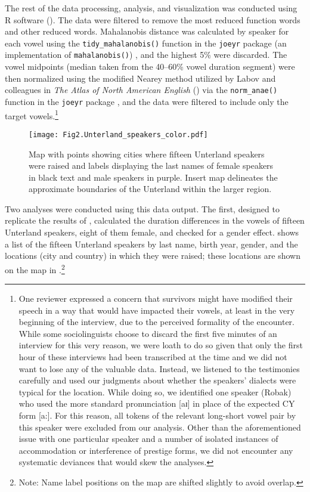 \documentclass[output=paper,colorlinks,citecolor=brown]{langscibook}
\begin{document}
The rest of the data processing, analysis, and visualization was conducted using R software (\citealt{Team2021}). The data were filtered to remove the most reduced function words and other reduced words. Mahalanobis distance was calculated by speaker for each vowel using the \texttt{tidy\_mahalanobis()} function in the \texttt{joeyr} package (an implementation of \texttt{mahalanobis()}) \citep{Stanley2020}, and the highest 5\% were discarded. The vowel midpoints (median taken from the 40--60\% vowel duration segment) were then normalized using the modified Nearey method utilized by Labov and colleagues in \textit{The Atlas of North American English} (\citealt{LabovBoberg2006}) via the \texttt{norm\_anae()} function in the \texttt{joeyr} package \citep{Stanley2020}, and the data were filtered to include only the target vowels.\footnote{One reviewer expressed a concern that survivors might have modified their speech in a way that would have impacted their vowels, at least in the very beginning of the interview, due to the perceived formality of the encounter. While some sociolinguists choose to discard the first five minutes of an interview for this very reason, we were loath to do so given that only the first hour of these interviews had been transcribed at the time and we did not want to lose any of the valuable data. Instead, we listened to the testimonies carefully and used our judgments about whether the speakers' dialects were typical for the location. While doing so, we identified one speaker (Robak) who used the more standard pronunciation [aɪ] in place of the expected CY form [a:]. For this reason, all tokens of the relevant long-short vowel pair by this speaker were excluded from our analysis. Other than the aforementioned issue with one particular speaker and a number of isolated instances of accommodation or interference of prestige forms, we did not encounter any systematic deviances that would skew the analyses.}

\begin{figure}
\texttt{[image: Fig2.Unterland\_speakers\_color.pdf]}
\caption{\label{fig:nove:2}Map with points showing cities where fifteen Unterland speakers were raised and labels displaying the last names of female speakers in black text and male speakers in purple. Insert map delineates the approximate boundaries of the Unterland within the larger region.}
\end{figure}


Two analyses were conducted using this data output. The first, designed to replicate the results of \citet{Nove2021}, calculated the duration differences in the vowels of fifteen Unterland speakers, eight of them female, and checked for a gender effect.  shows a list of the fifteen Unterland speakers by last name, birth year, gender, and the locations (city and country) in which they were raised; these locations are shown on the map in .\footnote{Note: Name label positions on the map are shifted slightly to avoid overlap.}
\end{document}
